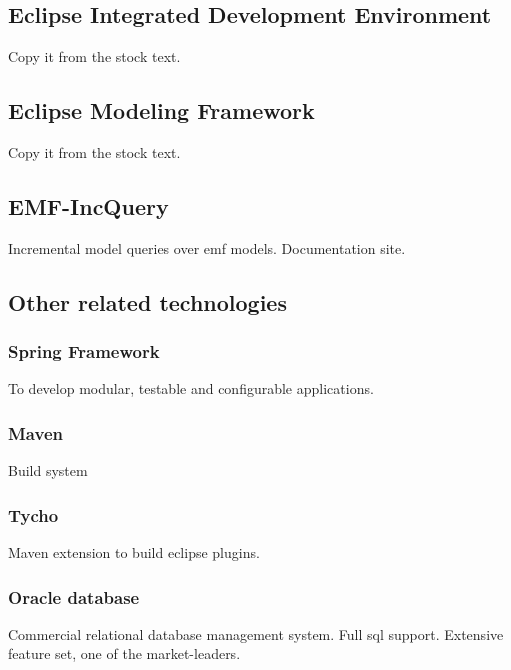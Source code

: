 \subsection{Eclipse Integrated Development Environment}
Copy it from the stock text.


\subsection{Eclipse Modeling Framework}
Copy it from the stock text.

\subsection{EMF-IncQuery} 
Incremental model queries over emf models. Documentation site.



\subsection{Other related technologies}

\subsubsection{Spring Framework}
To develop modular, testable and configurable applications.
\subsubsection{Maven}
Build system
\subsubsection{Tycho}
Maven extension to build eclipse plugins.
\subsubsection{Oracle database}
Commercial relational database management system. Full sql support. Extensive feature set, one of the market-leaders. 
